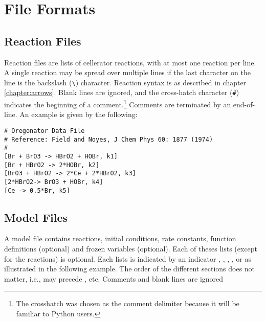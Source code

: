 \chapter{File Formats}

\section{Reaction Files}

Reaction files are lists of cellerator reactions, with at most one reaction per line. A single reaction may be spread over multiple lines if the last character on the line is the backslash (\verb|\|) character.  Reaction syntax is as described in chapter \ref{chapter:arrows}. Blank lines are ignored, and the cross-hatch character (\verb.#.) indicates the beginning of a comment.\footnote{The crosshatch was chosen as the comment delimiter because it will be familiar to Python users.} Comments are terminated by an end-of-line. An example is given by the following:


\begin{lstlisting}
# Oregonator Data File
# Reference: Field and Noyes, J Chem Phys 60: 1877 (1974)
#
[Br + BrO3 -> HBrO2 + HOBr, k1] 
[Br + HBrO2 -> 2*HOBr, k2]
[BrO3 + HBrO2 -> 2*Ce + 2*HBrO2, k3] 
[2*HBrO2-> BrO3 + HOBr, k4] 
[Ce -> 0.5*Br, k5]
\end{lstlisting}
\section{Model Files}

A model file contains reactions, initial conditions, rate constants, function definitions (optional) and frozen variables (optional). Each of theses lists (except for the reactions) is optional. Each lists is indicated by an indicator , , , ,  or  as illustrated in the following example. The order of the different sections does not matter, i.e.,  may precede , etc. Comments and blank lines are ignored

